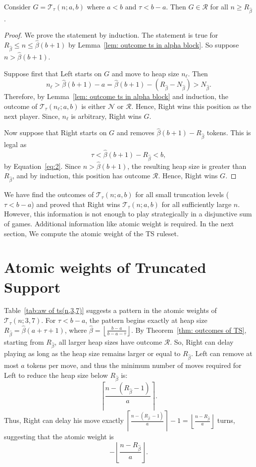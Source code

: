 \documentclass[oneside,reqno]{amsart}
\newcommand{\ts}{\mathcal{T}}
\newcommand{\rp}{\mathscr{R}}
\newcommand{\np}{\mathscr{N}}
\newcommand{\hbeta}{\widehat\beta}
\begin{document}
\begin{lemma}\label{lem: right dominating}
     Consider $G=\ts_\tau(n;a,b)$ where $a<b$ and $\tau<b-a$. Then  $G\in \rp$ for all $n\ge R_{\hbeta}$.
\end{lemma}
\begin{proof}
    We prove the statement by induction. %
    The statement is true for $R_{\hbeta}\le n\le \hbeta(b+1)$ by Lemma~\ref{lem: outcome ts in alpha block}. So suppose $n>\hbeta(b+1)$. 
    
    Suppose first that Left starts on $G$ and move to heap size $n_\ell$. Then $$n_\ell>\hbeta(b+1)-a=\hbeta(b+1)-(R_{\hbeta}-N_{\hbeta})>N_{\hbeta}.$$ Therefore, by Lemma~\ref{lem: outcome ts in alpha block} and induction, the outcome of $\ts_\tau(n_\ell;a,b)$ is either $\np$ or $\rp$. Hence, Right wins this position as the next player. Since, $n_\ell$ is arbitrary, Right wins $G$. 
    
    Now suppose that Right starts on $G$ and removes $\hbeta(b+1)-R_{\hbeta}$ tokens. This is legal as $$\tau<\hbeta(b+1)-R_{\hbeta}<b,$$ by Equation~\eqref{eq:2}. %
    Since $n>\hbeta(b+1)$, the resulting heap size is greater than $R_{\hbeta}$, and by induction, this position has outcome $\rp$. Hence, Right wins $G$. 
\end{proof}

We have find the outcomes of $\ts_\tau(n;a,b)$ for all small truncation levels ($\tau<b-a$) and proved that Right wins $\ts_\tau(n;a,b)$ for all sufficiently large $n$. However, this information is not enough to play strategically in a disjunctive sum of games. Additional information like atomic weight is required. In the next section, We compute the atomic weight of the {\sc TS} ruleset. 

\section{Atomic weights of Truncated Support}\label{sec: AW of TS} 
Table~\ref{tab:aw of ts(n,3,7)} suggests a pattern in the atomic weights of $\ts_\tau(n;3,7)$. For $\tau<b-a$, the pattern begins exactly at heap size 
$R_{\hbeta}=\hbeta(a+\tau+1)$, where $\hbeta=\left\lfloor\frac{b-a}{b-a-\tau}\right\rfloor$. By Theorem~\ref{thm: outcomes of TS}, starting from $R_{\hbeta}$, all larger heap sizes have outcome $\rp$. So, Right can delay playing as long as the heap size remains larger or equal to $R_{\hbeta}$.  Left can remove at most $a$ tokens per move, and thus the minimum number of moves required for Left to reduce the heap size below $R_{\hbeta}$ is: 
\[ 
\left\lceil\frac{n-(R_{\hbeta}-1)}{a}\right\rceil.
\] 
Thus, Right can delay his move exactly $\left\lceil\frac{n-(R_{\hbeta}\,-1)}{a}\right\rceil-1=\left\lfloor\frac{n-R_{\hbeta}}{a}\right\rfloor$ turns, suggesting that the atomic weight is
\[
-\left\lfloor\frac{n-R_{\hbeta}}{a}\right\rfloor.
\]
\end{document}
